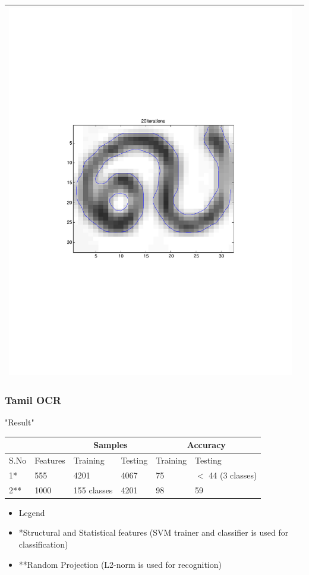 \documentclass{beamer}
\begin{document}
\begin{frame}
\begin{center}
\begin{tabular}{ | c | c |}
\includegraphics[scale=0.1]{./img/la} \\
\hline
\end{tabular}
\end{center}
\end{frame}

\begin{frame}
  \frametitle{Tamil OCR}
  "Result"
\begin{center}
\begin{tabular}{ | l | l | l | l | l | l |}
\hline
& &  \multicolumn{2}{|c|}{Samples}&\multicolumn{2}{|c|}{Accuracy} \\ \hline
S.No & Features &  Training &Testing & Training & Testing \\ \hline
1* & 555 & 4201 & 4067 & 75 & $<$ 44 (3 classes) \\ \hline
2** & 1000 & 155 classes& 4201 & 98 & 59 \\
\hline
\end{tabular}

\end{center}
        \begin{itemize}
	  \item Legend
  \item *Structural and Statistical features (SVM trainer and classifier is used for classification)
\item **Random Projection (L2-norm is used for recognition)
      \end{itemize}
\end{frame}
\end{document}

